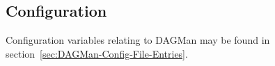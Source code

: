 
\subsection{\label{sec:DAGConfig}Configuration}

Configuration variables relating to DAGMan may be found
in 
section~\ref{sec:DAGMan-Config-File-Entries}.

